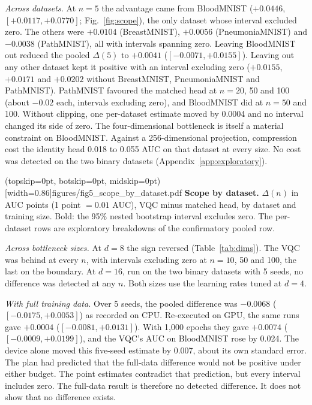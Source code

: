 \documentclass{ieeeaccess}
\newcommand{\vqc}{VQC}
\begin{document}
\emph{Across datasets.} At $n=5$ the advantage came from BloodMNIST ($+0.0446$, $[+0.0117,+0.0770]$; Fig.~\ref{fig:scope}), the only dataset whose interval excluded zero. The others were $+0.0104$ (BreastMNIST), $+0.0056$ (PneumoniaMNIST) and $-0.0038$ (PathMNIST), all with intervals spanning zero. Leaving BloodMNIST out reduced the pooled $\Delta(5)$ to $+0.0041$ ($[-0.0071,+0.0155]$). Leaving out any other dataset kept it positive with an interval excluding zero ($+0.0155$, $+0.0171$ and $+0.0202$ without BreastMNIST, PneumoniaMNIST and PathMNIST). PathMNIST favoured the matched head at $n=20$, 50 and 100 (about $-0.02$ each, intervals excluding zero), and BloodMNIST did at $n=50$ and 100. Without clipping, one per-dataset estimate moved by 0.0004 and no interval changed its side of zero. The four-dimensional bottleneck is itself a material constraint on BloodMNIST. Against a 256-dimensional projection, compression cost the identity head 0.018 to 0.055 AUC on that dataset at every size. No cost was detected on the two binary datasets (Appendix~\ref{app:exploratory}).

\Figure[t!](topskip=0pt, botskip=0pt, midskip=0pt)[width=0.86\columnwidth]{figures/fig5_scope_by_dataset.pdf}
{\textbf{Scope by dataset.} $\Delta(n)$ in AUC points (1 point $=0.01$ AUC), \vqc{} minus matched head, by dataset and training size. Bold: the 95\% nested bootstrap interval excludes zero. The per-dataset rows are exploratory breakdowns of the confirmatory pooled row.\label{fig:scope}}

\emph{Across bottleneck sizes.} At $d=8$ the sign reversed (Table~\ref{tab:dims}). The \vqc{} was behind at every $n$, with intervals excluding zero at $n=10$, 50 and 100, the last on the boundary. At $d=16$, run on the two binary datasets with 5 seeds, no difference was detected at any $n$. Both sizes use the learning rates tuned at $d=4$.

\emph{With full training data.} Over 5 seeds, the pooled difference was $-0.0068$ ($[-0.0175,+0.0053]$) as recorded on CPU. Re-executed on GPU, the same runs gave $+0.0004$ ($[-0.0081,+0.0131]$). With 1,000 epochs they gave $+0.0074$ ($[-0.0009,+0.0199]$), and the \vqc{}'s AUC on BloodMNIST rose by 0.024. The device alone moved this five-seed estimate by 0.007, about its own standard error. The plan had predicted that the full-data difference would not be positive under either budget. The point estimates contradict that prediction, but every interval includes zero. The full-data result is therefore no detected difference. It does not show that no difference exists.
\end{document}
